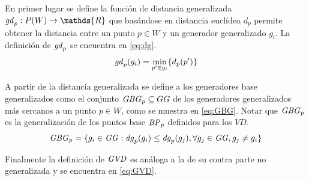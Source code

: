 En primer lugar se define la función de distancia generalizada
$\mli{gd}_p : P(W) \rightarrow \mathds{R}$ que basándose en distancia
euclídea $d_p$ permite obtener la distancia entre un punto
$p\in W$ y un generador generalizado $g_i$. La definición de $\mathit{gd}_p$ se encuentra en \eqref{eq:dg}.
\begin{equation}
  \mathit{gd}_p(g_i) = \min_{p'\in g_i}\{d_p(p')\} \label{eq:dg}
\end{equation}

A partir de la distancia generalizada se define a los generadores base
generalizados como el conjunto $\mathit{GBG}_p\subseteq GG$ de los generadores generalizados más
cercanos a un punto $p\in W$, como se muestra en \eqref{eq:GBG}. Notar que $\mathit{GBG}_p$ es la
generalización de los puntos base $\mathit{BP}_p$ definidos para los $VD$.
\begin{equation}
  \mathit{GBG}_p = \{g_i \in \mathit{GG}: \mathit{dg}_p(g_i) \leq \mathit{dg}_p(g_j), \forall g_j\in \mathit{GG}, g_j \neq g_i\}\label{eq:GBG}
\end{equation}

Finalmente la definición de $\mathit{GVD}$ es análoga a la de su contra parte no
generalizada y se encuentra en \eqref{eq:GVD}. 


